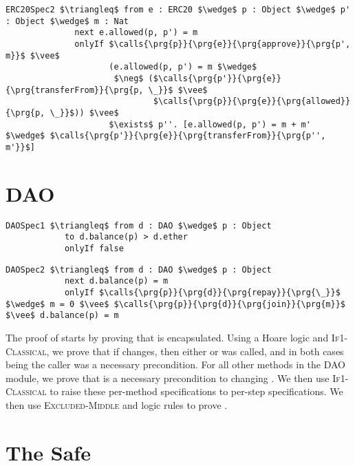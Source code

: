 \documentclass[acmsmall,review,anonymous]{acmart}\settopmatter{printfolios=true,printccs=false,printacmref=false}
\begin{document}
\begin{lstlisting}[language = Chainmail, mathescape=true, frame=lines]
ERC20Spec2 $\triangleq$ from e : ERC20 $\wedge$ p : Object $\wedge$ p' : Object $\wedge$ m : Nat
              next e.allowed(p, p') = m
              onlyIf $\calls{\prg{p}}{\prg{e}}{\prg{approve}}{\prg{p', m}}$ $\vee$ 
                     (e.allowed(p, p') = m $\wedge$ 
                      $\neg$ ($\calls{\prg{p'}}{\prg{e}}{\prg{transferFrom}}{\prg{p, \_}}$ $\vee$ 
                              $\calls{\prg{p}}{\prg{e}}{\prg{allowed}}{\prg{p, \_}}$)) $\vee$
                     $\exists$ p''. [e.allowed(p, p') = m + m' $\wedge$ $\calls{\prg{p'}}{\prg{e}}{\prg{transferFrom}}{\prg{p'', m'}}$]
\end{lstlisting}

\section{DAO}

\begin{lstlisting}[language = Chainmail, mathescape=true, frame=lines]
DAOSpec1 $\triangleq$ from d : DAO $\wedge$ p : Object
            to d.balance(p) > d.ether
            onlyIf false
\end{lstlisting}

\begin{lstlisting}[language = Chainmail, mathescape=true, frame=lines]
DAOSpec2 $\triangleq$ from d : DAO $\wedge$ p : Object
            next d.balance(p) = m
            onlyIf $\calls{\prg{p}}{\prg{d}}{\prg{repay}}{\prg{\_}}$ $\wedge$ m = 0 $\vee$ $\calls{\prg{p}}{\prg{d}}{\prg{join}}{\prg{m}}$ $\vee$ d.balance(p) = m
\end{lstlisting}
The proof of  starts by proving that  is encapsulated.
Using a Hoare logic and \textsc{If1-Classical}, we prove that if  changes,
then either  or  was called, and in both cases 
 being the caller was a necessary precondition. For all other methods in the DAO module, we prove that  is a necessary precondition to changing .
We then use \textsc{If1-Classical} to raise these per-method \Nec specifications to per-step specifications. We then use \textsc{Excluded-Middle} and \Nec logic rules to prove 
.

\section{The Safe}
\end{document}
